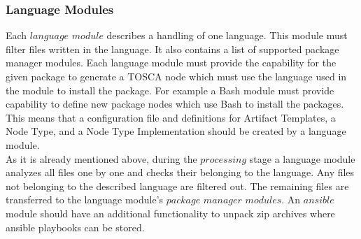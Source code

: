 \subsubsection{Language Modules} \label{subs:archlm}
Each $language$ $module$ describes a handling of one language.
This module must filter files written in the language.
It also contains a list of supported package manager modules.
Each language module must provide the capability for the given package to generate a TOSCA node which must use the language used in the module to install the package.
For example a Bash module must provide capability to define new package nodes which use Bash to install the packages.
This means that a configuration file and definitions for Artifact Templates, a Node Type, and a Node Type Implementation should be created by a language module.\\
As it is already mentioned above, during the $processing$ stage a language module analyzes all files one by one and checks their belonging to the language. 
Any files not belonging to the described language are filtered out.
The remaining files are transferred to the language module's $package$ $manager$ $modules$.
An $ansible$ module should have an additional functionality to unpack zip archives where ansible playbooks can be stored.

